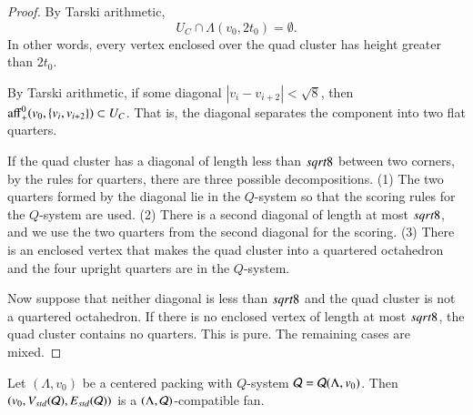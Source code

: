 \begin{proof}
By Tarski arithmetic, 
   $$U_C \cap \Lambda(v_0,2t_0) = \emptyset.$$
In other words, every vertex enclosed over the quad cluster has
height greater than  $2t_0$.

By Tarski arithmetic, if some diagonal $|v_i-v_{i+2}|<\sqrt8$,
then ${\operatorname{aff}}_+^0(v_0,\{v_i,v_{i+2}\})\subset U_C$. That is, the
diagonal separates the component into  two flat quarters.

If the quad cluster has a diagonal of length less than $sqrt8$
between two corners, by the rules for quarters,
there are three possible decompositions. (1)
The two quarters formed by the diagonal lie in the $Q$-system so
that the scoring rules for the $Q$-system are used.  (2) There is
a second diagonal of length at most $sqrt8$, and we use the two
quarters from the second diagonal for the scoring. (3) There is an
enclosed vertex that makes the quad cluster into a quartered
octahedron and the four upright quarters are in the $Q$-system.

Now suppose that neither diagonal is less than $sqrt8$ and the
quad cluster is not a quartered octahedron. If there is no
enclosed vertex of length at most $sqrt8$, the quad cluster
contains no quarters. This is pure.
The remaining cases are mixed.
\end{proof}





%

\begin{lemma}
Let $(\Lambda,v_0)$ be a centered packing with $Q$-system ${\mathcal Q} = {\mathcal Q}(\Lambda,v_0)$. 
Then $(v_0,V_{std}({\mathcal Q}),E_{std}({\mathcal Q}))$ is a
$(\Lambda,{\mathcal Q})$-compatible fan.
\end{lemma}


